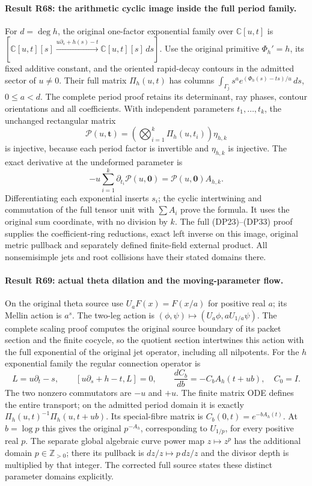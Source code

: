 \paragraph{Result R68: the arithmetic cyclic image inside the full period family.}
For $d=\deg h$, the original one-factor exponential family over
$\mathbb C[u,t]$ is
$[\mathbb C[u,t][s]\xrightarrow{u\partial_s+h(s)-t}
\mathbb C[u,t][s]\,ds]$.
Use the original primitive $\Phi_h'=h$, its fixed additive constant,
and the oriented rapid-decay contours in the admitted sector
of $u\ne0$. Their full matrix $\Pi_h(u,t)$ has columns
$\int_{\Gamma_j}s^a e^{(\Phi_h(s)-ts)/u}\,ds$, $0\le a<d$.
The complete period proof retains its determinant, ray phases,
contour orientations and all coefficients. With independent
parameters $t_1,\ldots,t_k$, the unchanged rectangular matrix
\[
\mathcal P(u,\mathbf t)=
  \left(\bigotimes_{i=1}^k\Pi_h(u,t_i)\right)\eta_{h,k}
\]
is injective, because each period factor is invertible and
$\eta_{h,k}$ is injective. The exact derivative at the
undeformed parameter is
\[
-u\sum_{i=1}^k\partial_{t_i}\mathcal P(u,\mathbf0)
=\mathcal P(u,\mathbf0)A_{h,k}.
\]
Differentiating each exponential inserts $s_i$; the cyclic
intertwining and commutation of the full tensor unit with
$\sum A_i$ prove the formula. It uses the original sum
coordinate, with no division by $k$.
The full (DP23)--(DP33) proof supplies the coefficient-ring
reductions, exact left inverse on this image, original metric
pullback and separately defined finite-field external product.
All nonsemisimple jets and root collisions have their stated
domains there.

\paragraph{Result R69: actual theta dilation and the moving-parameter flow.}
On the original theta source use
$U_aF(x)=F(x/a)$ for positive real $a$; its Mellin action is
$a^s$. The two-leg action is
$(\phi,\psi)\mapsto(U_a\phi,aU_{1/a}\psi)$.
The complete scaling proof computes the original source boundary
of its packet section and the finite cocycle, so the quotient
section intertwines this action with the full exponential of
the original jet operator, including all nilpotents.
For the $h$ exponential family the regular connection operator is
\[
L=u\partial_t-s,\qquad
[u\partial_s+h-t,L]=0,
\qquad
\frac{dC_b}{db}=-C_bA_h(t+ub),\quad C_0=I.
\]
The two nonzero commutators are $-u$ and $+u$. The finite matrix
ODE defines the entire transport; on the admitted period domain
it is exactly $\Pi_h(u,t)^{-1}\Pi_h(u,t+ub)$.
Its special-fibre matrix is $C_b(0,t)=e^{-bA_h(t)}$.
At $b=\log p$ this gives the original $p^{-A_h}$, corresponding
to $U_{1/p}$, for every positive real $p$. The separate global algebraic curve power
map $z\mapsto z^p$ has the additional domain $p\in\mathbb Z_{>0}$;
there its pullback is $dz/z\mapsto p\,dz/z$ and the divisor
depth is multiplied by that integer. The corrected full source
states these distinct parameter domains explicitly.

